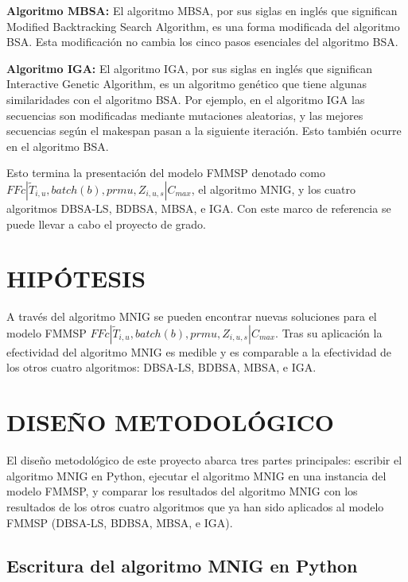 \documentclass{article}
\def\notac_modelo{$FFc | \tilde{T}_{i, u}, batch(b), prmu, Z_{i, u, s} | C_{max}$}
\begin{document}
\vspace{\baselineskip}
\textbf{Algoritmo MBSA:} El algoritmo MBSA, por sus siglas en inglés que significan Modified Backtracking Search Algorithm, es una forma modificada del algoritmo BSA. Esta modificación no cambia los cinco pasos esenciales del algoritmo BSA. \autocite{modFMMSP}

\vspace{\baselineskip}
\textbf{Algoritmo IGA:} El algoritmo IGA, por sus siglas en inglés que significan Interactive Genetic Algorithm, es un algoritmo genético que tiene algunas similaridades con el algoritmo BSA. Por ejemplo, en el algoritmo IGA las secuencias son modificadas mediante mutaciones aleatorias, y las mejores secuencias según el makespan pasan a la siguiente iteración. Esto también ocurre en el algoritmo BSA. \autocite{modFMMSP}

\vspace{\baselineskip}
Esto termina la presentación del modelo FMMSP denotado como \linebreak \notac_modelo, el algoritmo MNIG, y los cuatro algoritmos DBSA-LS, BDBSA, MBSA, e IGA. Con este marco de referencia se puede llevar a cabo el proyecto de grado.

\section{HIPÓTESIS}

A través del algoritmo MNIG se pueden encontrar nuevas soluciones para el modelo FMMSP \notac_modelo. Tras su aplicación la efectividad del algoritmo MNIG es medible y es comparable a la efectividad de los otros cuatro algoritmos: DBSA-LS, BDBSA, MBSA, e IGA.

\section{DISEÑO METODOLÓGICO}

El diseño metodológico de este proyecto abarca tres partes principales: escribir el algoritmo MNIG en Python, ejecutar el algoritmo MNIG en una instancia del modelo FMMSP, y comparar los resultados del algoritmo MNIG con los resultados de los otros cuatro algoritmos que ya han sido aplicados al modelo FMMSP (DBSA-LS, BDBSA, MBSA, e IGA).

\subsection{Escritura del algoritmo MNIG en Python}
\end{document}
